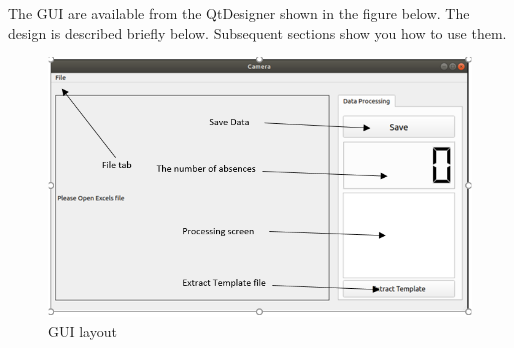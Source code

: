 \documentclass[journal, twocolumn]{IEEEtran}
\begin{document}
The GUI are available from the QtDesigner shown in the figure below. The design is described briefly below. Subsequent sections show you how to use them.

\begin{figure}[!h]
	\centering
	\includegraphics[width=0.8\linewidth]{img/user_guide.png}
	\caption{GUI layout}\label{fig:user_guide}
\end{figure}
\end{document}
